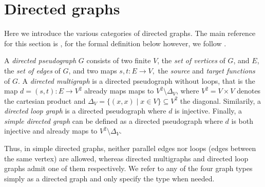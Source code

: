 




\section{Directed graphs}\label{sec:directed_graphs}


Here we introduce the various categories of directed graphs. The main
reference for this section is \textcite{Bang-Jensen_Digraphs}, for the
formal definition below however, we
follow \textcite{nLab}.

\begin{definition}
    
   
  \label{def:directed_graphs}
  A \textit{directed pseudograph} $G$ consists of two finite
  $V$, the \textit{set of vertices} of $G$, and $E$, the \textit{set
    of edges} of $G$, and two maps $ s,t: E \to V, $ the
  \textit{source} and \textit{target functions} of $G$. A
  \textit{directed multigraph} is a directed pseudograph without
  loops, that is the map $d = (s,t):E \to V^2$ already maps
  maps to $V^2\setminus\Delta_V$, where $V^2 = V \times V$ denotes the
  cartesian product and $\Delta_V = \{(x,x) \mid x \in V\} \subseteq
  V^2$ the diagonal. Similarily, a \textit{directed loop graph} is a
  directed pseudograph where $d$ is injective. Finally, a
  \textit{simple directed graph} can be defined as a directed
  pseudograph where $d$ is both injective and already maps to
  $V^2\setminus\Delta_V$.
\end{definition}

Thus, in simple directed graphs, neither parallel edges nor loops
(edges between the same vertex) are allowed, whereas directed
multigraphs and directed loop graphs admit one of them
respectively. We refer to any of the four graph types simply as a
directed graph and only specify the type when needed.

